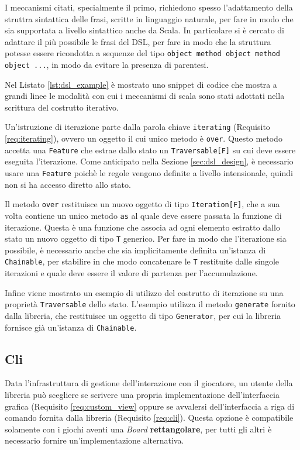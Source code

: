 I meccanismi citati, specialmente il primo, richiedono spesso l'adattamento della struttra sintattica delle frasi, scritte in linguaggio naturale, per fare in modo che sia supportata a livello sintattico anche da Scala.
%
In particolare si è cercato di adattare il più possibile le frasi del DSL, per fare in modo che la struttura potesse essere ricondotta a sequenze del tipo \texttt{object method object method object ...}, in modo da evitare la presenza di parentesi.

Nel Listato \ref{lst:dsl_example} è mostrato uno snippet di codice che mostra a grandi linee le modalità con cui i meccanismi di scala sono stati adottati nella scrittura del costrutto iterativo.
%

%
Un'istruzione di iterazione parte dalla parola chiave \texttt{iterating} (Requisito \ref{req:iterating}), ovvero un oggetto il cui unico metodo è \texttt{over}.
%
Questo metodo accetta una \texttt{Feature} che estrae dallo stato un \texttt{Traversable[F]} su cui deve essere eseguita l'iterazione.
%
Come anticipato nella Sezione \ref{sec:dsl_design}, è necessario usare una \texttt{Feature} poichè le regole vengono definite a livello intensionale, quindi non si ha accesso diretto allo stato.

Il metodo \texttt{over} restituisce un nuovo oggetto di tipo \texttt{Iteration[F]}, che a sua volta contiene un unico metodo \texttt{as} al quale deve essere passata la funzione di iterazione.
%
Questa è una funzione che associa ad ogni elemento estratto dallo stato un nuovo oggetto di tipo \texttt{T} generico.
%
Per fare in modo che l'iterazione sia possibile, è necessario anche che sia implicitamente definita un'istanza di \texttt{Chainable}, per stabilire in che modo concatenare le \texttt{T} restituite dalle singole iterazioni e quale deve essere il valore di partenza per l'accumulazione.

Infine viene mostrato un esempio di utilizzo del costrutto di iterazione su una proprietà \texttt{Traversable} dello stato.
%
L'esempio utilizza il metodo \texttt{generate} fornito dalla libreria, che restituisce un oggetto di tipo \texttt{Generator}, per cui la libreria fornisce già un'istanza di \texttt{Chainable}.


\subsection{Cli}
%
Data l'infrastruttura di gestione dell'interazione con il giocatore, un utente della libreria può scegliere se scrivere una propria implementazione dell'interfaccia grafica (Requisito \ref{req:custom_view} oppure se avvalersi dell'interfaccia a riga di comando fornita dalla libreria (Requisito \ref{req:cli}).
%
Questa opzione è compatibile solamente con i giochi aventi una \textit{Board} \textbf{rettangolare}, per tutti gli altri è necessario fornire un'implementazione alternativa.

